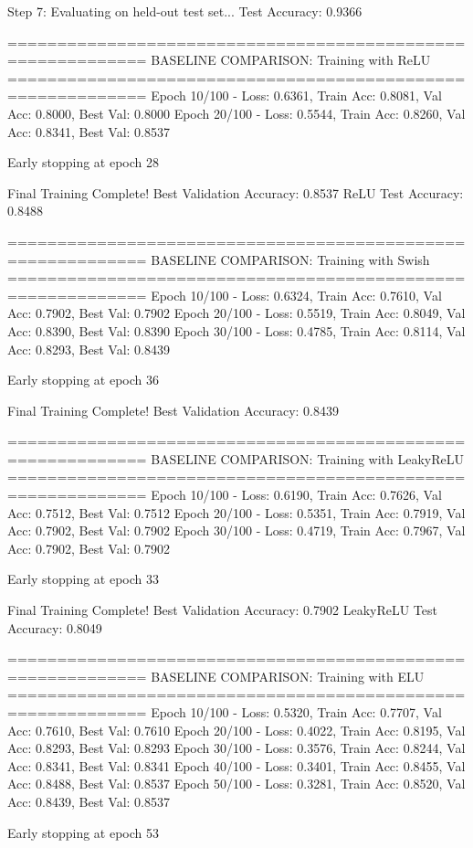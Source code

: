 Step 7: Evaluating on held-out test set...
Test Accuracy: 0.9366

============================================================
BASELINE COMPARISON: Training with ReLU
============================================================
Epoch  10/100 - Loss: 0.6361, Train Acc: 0.8081, Val Acc: 0.8000, Best Val: 0.8000
Epoch  20/100 - Loss: 0.5544, Train Acc: 0.8260, Val Acc: 0.8341, Best Val: 0.8537

Early stopping at epoch 28

Final Training Complete!
Best Validation Accuracy: 0.8537
ReLU Test Accuracy: 0.8488

============================================================
BASELINE COMPARISON: Training with Swish
============================================================
Epoch  10/100 - Loss: 0.6324, Train Acc: 0.7610, Val Acc: 0.7902, Best Val: 0.7902
Epoch  20/100 - Loss: 0.5519, Train Acc: 0.8049, Val Acc: 0.8390, Best Val: 0.8390
Epoch  30/100 - Loss: 0.4785, Train Acc: 0.8114, Val Acc: 0.8293, Best Val: 0.8439

Early stopping at epoch 36

Final Training Complete!
Best Validation Accuracy: 0.8439

============================================================
BASELINE COMPARISON: Training with LeakyReLU
============================================================
Epoch  10/100 - Loss: 0.6190, Train Acc: 0.7626, Val Acc: 0.7512, Best Val: 0.7512
Epoch  20/100 - Loss: 0.5351, Train Acc: 0.7919, Val Acc: 0.7902, Best Val: 0.7902
Epoch  30/100 - Loss: 0.4719, Train Acc: 0.7967, Val Acc: 0.7902, Best Val: 0.7902

Early stopping at epoch 33

Final Training Complete!
Best Validation Accuracy: 0.7902
LeakyReLU Test Accuracy: 0.8049

============================================================
BASELINE COMPARISON: Training with ELU
============================================================
Epoch  10/100 - Loss: 0.5320, Train Acc: 0.7707, Val Acc: 0.7610, Best Val: 0.7610
Epoch  20/100 - Loss: 0.4022, Train Acc: 0.8195, Val Acc: 0.8293, Best Val: 0.8293
Epoch  30/100 - Loss: 0.3576, Train Acc: 0.8244, Val Acc: 0.8341, Best Val: 0.8341
Epoch  40/100 - Loss: 0.3401, Train Acc: 0.8455, Val Acc: 0.8488, Best Val: 0.8537
Epoch  50/100 - Loss: 0.3281, Train Acc: 0.8520, Val Acc: 0.8439, Best Val: 0.8537

Early stopping at epoch 53

